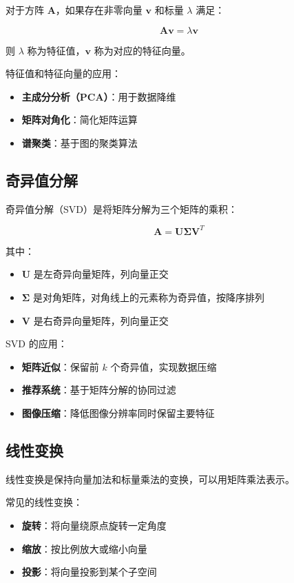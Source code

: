 \documentclass[12pt,UTF8]{ctexbook}
\begin{document}
对于方阵 $\mathbf{A}$，如果存在非零向量 $\mathbf{v}$ 和标量 $\lambda$ 满足：

$$\mathbf{A}\mathbf{v} = \lambda\mathbf{v}$$

则 $\lambda$ 称为特征值，$\mathbf{v}$ 称为对应的特征向量。

特征值和特征向量的应用：
\begin{itemize}[leftmargin=2cm]
    \item \textbf{主成分分析（PCA）}：用于数据降维
    \item \textbf{矩阵对角化}：简化矩阵运算
    \item \textbf{谱聚类}：基于图的聚类算法
\end{itemize}

\subsection{奇异值分解}

奇异值分解（SVD）是将矩阵分解为三个矩阵的乘积：

$$\mathbf{A} = \mathbf{U}\mathbf{\Sigma}\mathbf{V}^T$$

其中：
\begin{itemize}[leftmargin=2cm]
    \item $\mathbf{U}$ 是左奇异向量矩阵，列向量正交
    \item $\mathbf{\Sigma}$ 是对角矩阵，对角线上的元素称为奇异值，按降序排列
    \item $\mathbf{V}$ 是右奇异向量矩阵，列向量正交
\end{itemize}

SVD 的应用：
\begin{itemize}[leftmargin=2cm]
    \item \textbf{矩阵近似}：保留前 $k$ 个奇异值，实现数据压缩
    \item \textbf{推荐系统}：基于矩阵分解的协同过滤
    \item \textbf{图像压缩}：降低图像分辨率同时保留主要特征
\end{itemize}

\subsection{线性变换}

线性变换是保持向量加法和标量乘法的变换，可以用矩阵乘法表示。

常见的线性变换：
\begin{itemize}[leftmargin=2cm]
    \item \textbf{旋转}：将向量绕原点旋转一定角度
    \item \textbf{缩放}：按比例放大或缩小向量
    \item \textbf{投影}：将向量投影到某个子空间
\end{itemize}
\end{document}
